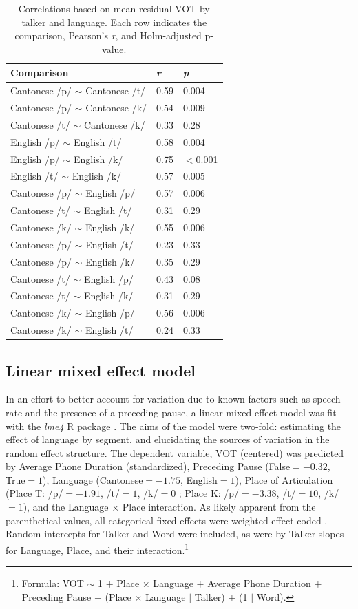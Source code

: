 \begin{table}[hbt]
\caption{Correlations based on mean residual VOT by talker and language. Each row indicates the comparison, Pearson's \textit{r}, and Holm-adjusted p-value.}
  \label{tab:correlations}
  \centering
  \begin{tabular}{lll}
    \toprule
\textbf{Comparison}			& \textbf{\textit{r}}	& \textbf{\textit{p}} \\
\midrule
Cantonese /p/ $\sim$ Cantonese /t/   &	0.59	&	0.004 \\
Cantonese /p/ $\sim$ Cantonese /k/   &	0.54	&	0.009 \\
Cantonese /t/ $\sim$ Cantonese /k/   &	0.33	&	0.28 \\
English /p/ $\sim$ English /t/	     &	0.58	&	0.004 \\
English /p/ $\sim$ English /k/	     &	0.75 	&	$<$0.001 \\
English /t/ $\sim$ English /k/	     &	0.57	&	0.005 \\
Cantonese /p/ $\sim$ English /p/	 &	0.57	&	0.006 \\
Cantonese /t/ $\sim$ English /t/	 &	0.31	&	0.29 \\
Cantonese /k/ $\sim$ English /k/	 &	0.55	&	0.006 \\
Cantonese /p/ $\sim$ English /t/	 &	0.23	&	0.33 \\
Cantonese /p/ $\sim$ English /k/	 &	0.35	&	0.29 \\
Cantonese /t/ $\sim$ English /p/	 &	0.43	&	0.08 \\
Cantonese /t/ $\sim$ English /k/	 &	0.31	&	0.29 \\
Cantonese /k/ $\sim$ English /p/	 &	0.56	&	0.006 \\
Cantonese /k/ $\sim$ English /t/	 &	0.24	&	0.33 \\
    \bottomrule
  \end{tabular}
\end{table}

\subsection{Linear mixed effect model}
In an effort to better account for variation due to known factors such as speech rate and the presence of a preceding pause, a linear mixed effect model was fit with the \textit{lme4} R package \citep{bates_2015_lme4}. The aims of the model were two-fold: estimating the effect of language by segment, and elucidating the sources of variation in the random effect structure. The dependent variable, VOT (centered) was predicted by Average Phone Duration (standardized), Preceding Pause (False$=-0.32$, True$=1$), Language (Cantonese$=-1.75$, English$=1$), Place of Articulation (Place T: /p/$=-1.91$, /t/$=1$, /k/$=0$ ; Place K: /p/$=-3.38$, /t/$=10$, /k/$=1$), and the Language $\times$ Place interaction. As likely apparent from the parenthetical values, all categorical fixed effects were weighted effect coded \citep[following][]{chodroff_2017_structure}. Random intercepts for Talker and Word were included, as were by-Talker slopes for Language, Place, and their interaction.\footnote{Formula: VOT $\sim$ 1 $+$ Place $\times$ Language $+$ Average Phone Duration $+$ Preceding Pause $+$ (Place $\times$ Language $|$ Talker) $+$ (1 $|$ Word).}

